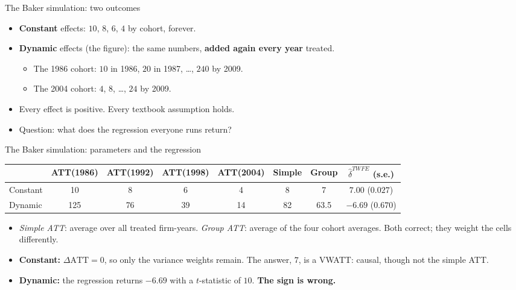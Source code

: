 \documentclass[
  11pt,
  ignorenonframetext,
  aspectratio=169,
]{beamer}
\providecommand{\tightlist}{%
  \setlength{\itemsep}{0pt}\setlength{\parskip}{0pt}}
\begin{document}
\begin{frame}{The Baker simulation: two outcomes}
\protect{}\label{the-baker-simulation-two-outcomes}
\begin{itemize}
\tightlist
\item
  \textbf{Constant} effects: \(10\), \(8\), \(6\), \(4\) by cohort,
  forever.
\item
  \textbf{Dynamic} effects (the figure): the same numbers, \textbf{added
  again every year} treated.

  \begin{itemize}
  \tightlist
  \item
    The 1986 cohort: \(10\) in 1986, \(20\) in 1987, \ldots, \(240\) by
    2009.
  \item
    The 2004 cohort: \(4\), \(8\), \ldots, \(24\) by 2009.
  \end{itemize}
\end{itemize}

\vspace{0.4em}

\begin{itemize}
\tightlist
\item
  Every effect is positive. Every textbook assumption holds.
\item
  Question: what does the regression everyone runs return?
\end{itemize}
\end{frame}

\begin{frame}{The Baker simulation: parameters and the regression}
\protect{}\label{the-baker-simulation-parameters-and-the-regression}
\begin{center}\scriptsize
\begin{tabular}{lcccccc|c}
\toprule
 & ATT(1986) & ATT(1992) & ATT(1998) & ATT(2004) & Simple & Group & $\hat\delta^{TWFE}$ (s.e.) \\
\midrule
Constant & 10 & 8 & 6 & 4 & 8 & 7 & $7.00$ ($0.027$) \\
Dynamic & 125 & 76 & 39 & 14 & 82 & 63.5 & $\mathbf{-6.69}$ ($0.670$) \\
\bottomrule
\end{tabular}
\end{center}

\begin{itemize}
\tightlist
\item
  \emph{Simple ATT}: average over all treated firm-years. \emph{Group
  ATT}: average of the four cohort averages. Both correct; they weight
  the cells differently.
\item
  \textbf{Constant:} \(\Delta\text{ATT} = 0\), so only the variance
  weights remain. The answer, \(7\), is a VWATT: causal, though not the
  simple ATT.
\item
  \textbf{Dynamic:} the regression returns \(\mathbf{-6.69}\) with a
  \(t\)-statistic of \(10\). \textbf{The sign is wrong.}
\end{itemize}
\end{frame}
\end{document}
